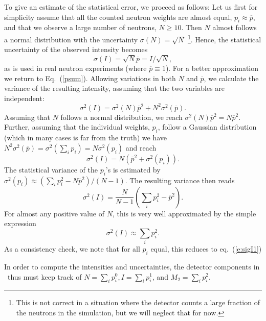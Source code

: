 To give an estimate of the statistical error, we proceed as follows:
Let us first for simplicity assume that all the counted neutron weights are
almost equal, $p_i \approx \overline{p}$,
and that we observe a large number of neutrons, $N \geq 10$.
Then $N$ almost follows a normal distribution
with the uncertainty $\sigma(N) = \sqrt{N}$
\footnote{This is not correct in a
situation where the detector counts a large fraction of the
neutrons in the simulation, but we will neglect that for now.}.
Hence, the statistical uncertainty of the observed intensity becomes
\begin{equation} \label{e:sigI1}
 \sigma(I) = \sqrt{N} \overline{p} = I / \sqrt{N} ,
\end{equation}
as is used in real neutron experiments (where $\overline{p} \equiv 1$).
For a better approximation we return to Eq.~(\ref{psum}).
Allowing variations in both $N$ and $\overline{p}$,
we calculate the variance of the resulting intensity,
assuming that the two variables are independent:
\begin{equation}
\sigma^2(I) = \sigma^2(N) \overline{p}^2 + N^2 \sigma^2(\overline{p}) .
\end{equation}
Assuming that $N$ follows a normal distribution, we reach 
$\sigma^2(N) \overline{p}^2 = N \overline{p}^2$.
Further, assuming that the individual weights, $p_i$, 
follow a Gaussian distribution (which in many cases is far from the truth)
we have 
$N^2 \sigma^2(\overline{p}) = \sigma^2(\sum_i p_i) = N \sigma^2(p_i)$
and reach
\begin{equation}
\sigma^2(I) = N \left( \overline{p}^2 + \sigma^2(p_i) \right).
\end{equation}
The statistical variance of the $p_i$'s is estimated by
$\sigma^2(p_i) \approx  (\sum_i p_i^2 - N \overline{p}^2) / (N-1)$.
The resulting variance then reads
\begin{equation}
\sigma^2(I) = \frac{N}{N-1} \left( \sum_i p_i^2 - \overline{p}^2  \right) .
\end{equation}
For almost any positive value of $N$, this is very well approximated
by the simple expression
\begin{equation}
\sigma^2(I) \approx \sum_i p_i^2 .
\end{equation}
As a consistency check, we note that for all $p_i$ equal, this reduces to
eq.~(\ref{e:sigI1})

In order to compute the intensities and uncertainties, the detector components
in \MCS\ thus must keep track of
$N=\sum_i p_i^0, I=\sum_i p_i^1$, and $M_2 = \sum_i p_i^2$.

